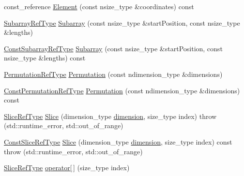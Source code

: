 \begin{DoxyCompactItemize}
\item 
const\-\_\-reference \hyperlink{classvct_dynamic_n_array_base_aede976966fffbaa5edb653a079f7c97c}{Element} (const nsize\-\_\-type \&coordinates) const 
\item 
\hyperlink{classvct_dynamic_const_n_array_base_a4db8630795191b1854a5af85b9327ee3}{Subarray\-Ref\-Type} \hyperlink{classvct_dynamic_n_array_base_af9c93b8d23bce2c21877c17c5cfb37f3}{Subarray} (const nsize\-\_\-type \&start\-Position, const nsize\-\_\-type \&lengths)
\item 
\hyperlink{classvct_dynamic_const_n_array_base_a4b3508630e409eda4f0d2f55d17d89a4}{Const\-Subarray\-Ref\-Type} \hyperlink{classvct_dynamic_n_array_base_a278d54b4dab29f2a5e1debc8d9d15947}{Subarray} (const nsize\-\_\-type \&start\-Position, const nsize\-\_\-type \&lengths) const 
\item 
\hyperlink{classvct_dynamic_const_n_array_base_a968acf814b972b47aa2ea39105e67fb3}{Permutation\-Ref\-Type} \hyperlink{classvct_dynamic_n_array_base_ac321d29709503ee3fd2e54d71a812dfa}{Permutation} (const ndimension\-\_\-type \&dimensions)
\item 
\hyperlink{classvct_dynamic_const_n_array_base_a412fcb88d50ea2e1d809efab113968fc}{Const\-Permutation\-Ref\-Type} \hyperlink{classvct_dynamic_n_array_base_a081bce5e64a529f2ff318fed133babab}{Permutation} (const ndimension\-\_\-type \&dimensions) const 
\item 
\hyperlink{classvct_dynamic_const_n_array_base_a4170184942c320b2402ba8dfdab9a915}{Slice\-Ref\-Type} \hyperlink{classvct_dynamic_n_array_base_a63ab912937e693a8890130177fa56651}{Slice} (dimension\-\_\-type \hyperlink{classvct_dynamic_const_n_array_base_aad976ad48dc9b1006d9e2729195f0b7c}{dimension}, size\-\_\-type index)  throw (std\-::runtime\-\_\-error, std\-::out\-\_\-of\-\_\-range)
\item 
\hyperlink{classvct_dynamic_const_n_array_base_ad4a09eb0789ba4c5b8d799fbe0ee3d79}{Const\-Slice\-Ref\-Type} \hyperlink{classvct_dynamic_n_array_base_a04dbc6f6be3ab76bfd62b77f424028c6}{Slice} (dimension\-\_\-type \hyperlink{classvct_dynamic_const_n_array_base_aad976ad48dc9b1006d9e2729195f0b7c}{dimension}, size\-\_\-type index) const   throw (std\-::runtime\-\_\-error, std\-::out\-\_\-of\-\_\-range)
\item 
\hyperlink{classvct_dynamic_const_n_array_base_a4170184942c320b2402ba8dfdab9a915}{Slice\-Ref\-Type} \hyperlink{classvct_dynamic_n_array_base_a419ca05b928751d175878cda0868e562}{operator\mbox{[}$\,$\mbox{]}} (size\-\_\-type index)
\item 

\end{DoxyCompactItemize}
